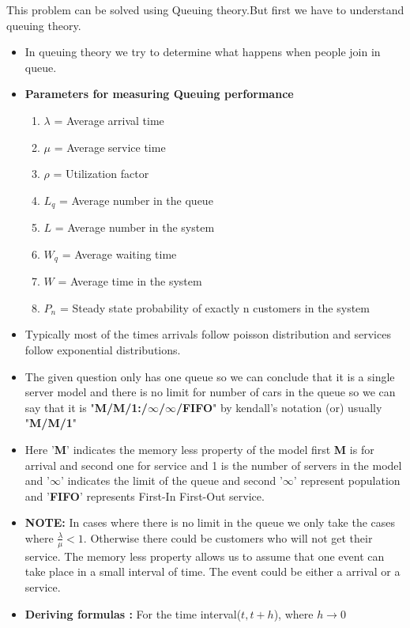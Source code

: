 This problem can be solved using Queuing theory.But first we have to understand queuing theory.
\begin{itemize}
\item In queuing theory we try to determine what happens when people join in queue.
\item\textbf{Parameters for measuring Queuing performance}
\begin{enumerate}
    \item $\lambda$ = Average arrival time
    \item $\mu$ = Average service time
    \item $\rho$ = Utilization factor
    \item $L_q$ = Average number in the queue
    \item $L$ = Average number in the system
    \item $W_q$ = Average waiting time
    \item $W$ = Average time in the system
    \item $P_n$ = Steady state probability of exactly n customers in the system
\end{enumerate}
\item Typically most of the times arrivals follow poisson distribution and services follow exponential distributions.
\item The given question only has one queue so we can conclude that it is a single server model and there is no limit for number of cars in the queue so we can say that it is "\textbf{M/M/1:/$\infty$/$\infty$/FIFO}" by kendall's notation (or) usually "\textbf{M/M/1}" 
\item Here '\textbf{M}' indicates the memory less property of the model first \textbf{M} is for arrival and second one for service and 1 is the number of servers in the model and '$\infty$' indicates the limit of the queue and second '$\infty$' represent population and '\textbf{FIFO}' represents First-In First-Out service.
\item \textbf{NOTE:} In cases where there is no limit in the queue we only take the cases where $\frac{\lambda}{\mu}<1$. Otherwise there could be customers who will not get their service. \newline The memory less property allows us to assume that one event can take place in a small interval of time. The event could be either a arrival or a service.
\item\textbf{Deriving formulas :}
 For the time interval($t,t+h$), where $h \to 0$
\begin{align}

\end{align}
\end{itemize}
